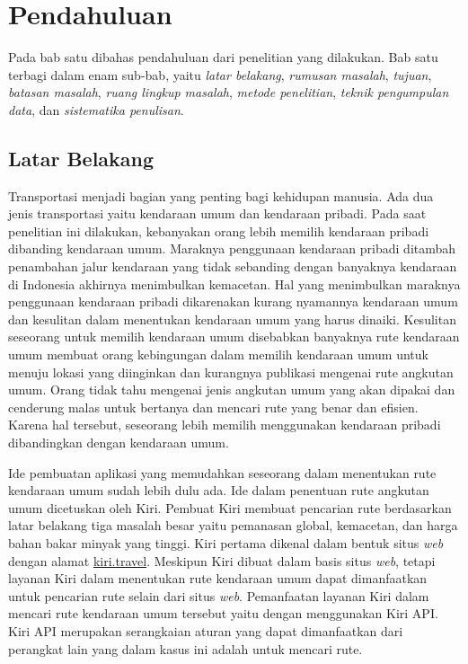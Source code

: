 \chapter{Pendahuluan}
\label{chap:intro}

Pada bab satu dibahas pendahuluan dari penelitian yang dilakukan. Bab satu terbagi dalam enam sub-bab, yaitu \textit{latar belakang}, \textit{rumusan masalah}, \textit{tujuan}, \textit{batasan masalah}, \textit{ruang lingkup masalah}, \textit{metode penelitian}, \textit{teknik pengumpulan data}, dan \textit{sistematika penulisan}.

\section{Latar Belakang}
\label{sec:latar_belakang}
\hspace{0.5cm} Transportasi menjadi bagian yang penting bagi kehidupan manusia. Ada dua jenis transportasi yaitu kendaraan umum dan kendaraan pribadi. Pada saat penelitian ini dilakukan, kebanyakan orang lebih memilih kendaraan pribadi dibanding kendaraan umum. Maraknya penggunaan kendaraan pribadi ditambah penambahan jalur kendaraan yang tidak sebanding dengan banyaknya kendaraan di Indonesia akhirnya menimbulkan kemacetan. Hal yang menimbulkan maraknya penggunaan kendaraan pribadi dikarenakan kurang nyamannya kendaraan umum dan kesulitan dalam menentukan kendaraan umum yang harus dinaiki. Kesulitan seseorang untuk memilih kendaraan umum disebabkan banyaknya rute kendaraan umum membuat orang kebingungan dalam memilih kendaraan umum untuk menuju lokasi yang diinginkan dan kurangnya publikasi mengenai rute angkutan umum. Orang tidak tahu mengenai jenis angkutan umum yang akan dipakai dan cenderung malas untuk bertanya dan mencari rute yang benar dan efisien. Karena hal tersebut, seseorang lebih memilih menggunakan kendaraan pribadi dibandingkan dengan kendaraan umum. 

Ide pembuatan aplikasi yang memudahkan seseorang dalam menentukan rute kendaraan umum sudah lebih dulu ada. Ide dalam penentuan rute angkutan umum dicetuskan oleh Kiri. Pembuat Kiri membuat pencarian rute berdasarkan latar belakang tiga masalah besar yaitu pemanasan global, kemacetan, dan harga bahan bakar minyak yang tinggi\footnotemark[1]. Kiri pertama dikenal dalam bentuk situs \textit{web} dengan alamat \url{kiri.travel}. Meskipun Kiri dibuat dalam basis situs \textit{web}, tetapi layanan Kiri dalam menentukan rute kendaraan umum dapat dimanfaatkan untuk pencarian rute selain dari situs \textit{web}. Pemanfaatan layanan Kiri dalam mencari rute kendaraan umum tersebut yaitu dengan menggunakan Kiri API. Kiri API merupakan serangkaian aturan yang dapat dimanfaatkan dari perangkat lain yang dalam kasus ini adalah untuk mencari rute.

